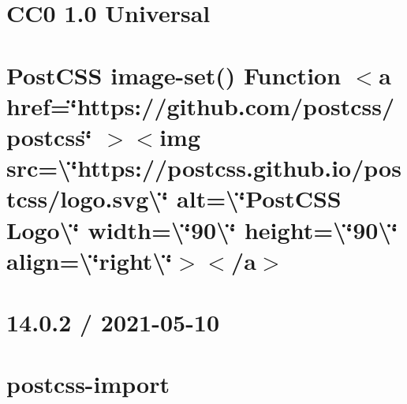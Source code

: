 \documentclass[twoside]{book}
\newcommand{\+}{\discretionary{\mbox{\scriptsize$\hookleftarrow$}}{}{}}
\begin{document}
\chapter{CC0 1.0 Universal}
\label{md__c___users_vaishnavi_jadhav__desktop__developer_code_mean_stack_example_client_node_modules_pfa5f8560e51991a33b6d2783e73be828}

\chapter{Post\+CSS image-\/set() Function \texorpdfstring{$<$}{<}a href=\char`\"{}https\+://github.\+com/postcss/postcss\char`\"{} \texorpdfstring{$>$}{>}\texorpdfstring{$<$}{<}img src=\textbackslash{}\char`\"{}https\+://postcss.\+github.\+io/postcss/logo.\+svg\textbackslash{}\char`\"{} alt=\textbackslash{}\char`\"{}\+Post\+CSS Logo\textbackslash{}\char`\"{} width=\textbackslash{}\char`\"{}90\textbackslash{}\char`\"{} height=\textbackslash{}\char`\"{}90\textbackslash{}\char`\"{} align=\textbackslash{}\char`\"{}right\textbackslash{}\char`\"{}\texorpdfstring{$>$}{>}\texorpdfstring{$<$}{<}/a\texorpdfstring{$>$}{>}}
\label{md__c___users_vaishnavi_jadhav__desktop__developer_code_mean_stack_example_client_node_modules_p7d36306ba368b3fb0d8643d70f5fba75}

\chapter{14.0.2 / 2021-\/05-\/10}
\label{md__c___users_vaishnavi_jadhav__desktop__developer_code_mean_stack_example_client_node_modules_p590098bbb3038e5056d52ca5f6f6edfe}

\chapter{postcss-\/import}
\label{md__c___users_vaishnavi_jadhav__desktop__developer_code_mean_stack_example_client_node_modules_postcss_import__r_e_a_d_m_e}

\end{document}
